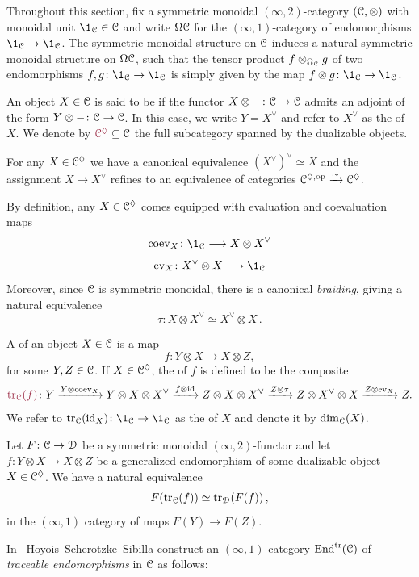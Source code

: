 Throughout this section, fix a symmetric monoidal $(\infty,2)$-category $(\mathcal{C},\otimes)$ with
monoidal unit $\1_{\cC} \in \cC$ and write $\Omega\mathcal{C}$ for the $(\infty,1)$-category of
endomorphisms $\1_{\cC} \to \1_{\cC}$. The symmetric monoidal structure on $\mathcal{C}$
induces a natural symmetric monoidal structure on $\Omega \mathcal{C}$, such that
the tensor product $f\otimes_{\Omega_{\mathcal{C}}} g$ of two endomorphisms
$f,g\colon \1_{\cC} \to \1_{\cC}$ is simply given by the map $f\otimes g\colon \1_{\cC} \to \1_{\cC}$. 

\begin{defn}
  An object $X\in \mathcal{C}$ is said to be 
  if the functor $X\otimes - \colon \mathcal{C} \to \mathcal{C}$ admits an adjoint of the form
  $Y\otimes - \colon \mathcal{C} \to \mathcal{C}$. In this case, we write $Y= X^{\vee}$ and refer to $X^{\vee}$ as
  the  of $X$. We denote by $\mdef{\cC^{\dual}}\subseteq \cC$ the full subcategory
  spanned by the dualizable objects.
\end{defn}

\begin{rmk}
  For any $X\in \mathcal{C}^{\lozenge}$ we have a canonical equivalence $(X^{\vee})^{\vee}\simeq X$ and
  the assignment $X \mapsto X^{\vee}$ refines to an equivalence of categories
  $\mathcal{C}^{\lozenge, {\mathrm{op}}}\xrightarrow{\sim} \mathcal{C}^{\lozenge}$.
\end{rmk}

By definition, any $X\in \mathcal{C}^{\lozenge}$ comes equipped with evaluation and
coevaluation maps
\[ \coev_{X}\colon \1_{\cC} \too X\otimes X^{\vee}\]
\[ \ev_{X}\colon X^{\vee} \otimes X \too \1_{\cC}\]
Moreover, since $\mathcal{C}$ is symmetric monoidal, there is a canonical \textit{braiding}, giving a natural
equivalence
\[ \tau \colon X\otimes X^{\vee} \simeq X^{\vee} \otimes X \,.\]

\begin{defn}
  A  of an object $X\in \mathcal{C}$ is a map
  \[ f\colon Y\otimes X  \to X \otimes Z,\]
  for some $Y,Z\in \mathcal{C}$. If $X\in \mathcal{C}^{\lozenge}$,
  the  of $f$ is defined to be the composite
  \[ \mdef{\tr{f}{\cC}} \colon  Y \rar{Y \otimes \coev_X} Y\otimes X \otimes X^{\vee} \rar{f \otimes \id} Z\otimes X \otimes X^{\vee} \rar{Z\otimes \tau} Z\otimes  X^{\vee} \otimes X \rar{Z\otimes \ev_X} Z .\]
  We refer to $\tr{\id_X}{\cC}\colon \1_{\cC} \to \1_{\cC}$ as the  of
  $X$ and denote it by $\mathrm{dim}_{\mathcal{C}}(X)$.
\end{defn}

\begin{lem}\label{lem: sym mon preserve trace}
    Let $F\colon \mathcal{C}\to \mathcal{D}$ be a symmetric monoidal $(\infty,2)$-functor
    and let $f\colon Y\otimes X \to X\otimes Z$ be a generalized
    endomorphism of some dualizable object $X\in \mathcal{C}^{\lozenge}$.  
    We have a natural equivalence 
    \[ F(\mathrm{tr}_{\mathcal{C}} (f))\simeq \mathrm{tr}_{\mathcal{D}} (F(f))\,, \]
    in the $(\infty,1)$ category of maps $F(Y)\to F(Z)$. 
\end{lem}
In~\cite{Hoyois_Scherotzke_Sibilla2017} Hoyois--Scherotzke--Sibilla construct an $(\infty,1)$-category $\mathrm{End}^{\mathrm{tr}}(\mathcal{C})$
of \textit{traceable endomorphisms} in $\mathcal{C}$ as follows:

